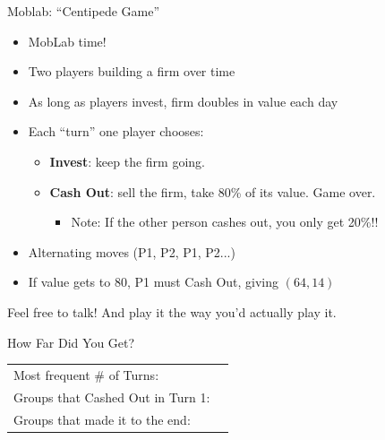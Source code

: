 
\begin{frame}{Moblab: ``Centipede Game''}
\begin{itemize}
    \item MobLab time!
    \item Two players building a firm over time
    \item As long as players invest, firm doubles in value each day
    \item Each ``turn'' one player chooses:
    \begin{itemize}
        \item \textbf{Invest}: keep the firm going.
        \item \textbf{Cash Out}: sell the firm, take 80\% of its value. Game over.
        \begin{itemize}
            \item Note: If the other person cashes out, you only get 20\%!!
        \end{itemize}
    \end{itemize}
    \item Alternating moves (P1, P2, P1, P2...)
    \item If value gets to 80, P1 must Cash Out, giving $(64,14)$
\end{itemize}
\bsk
\vfill
\centering
Feel free to talk! And play it the way you'd actually play it.
\vspace{-0.3in}
\end{frame}

\begin{frame}{How Far Did You Get?}
\vspace{0.5in}
\centering
\begin{tabular}{lc}
Most frequent \# of Turns: & \underline{\hspace{1in}} \\[0.3in]
Groups that Cashed Out in Turn 1: & \underline{\hspace{1in}} \\[0.3in]
Groups that made it to the end: & \underline{\hspace{1in}} \\[0.3in]
\end{tabular}
\end{frame}

